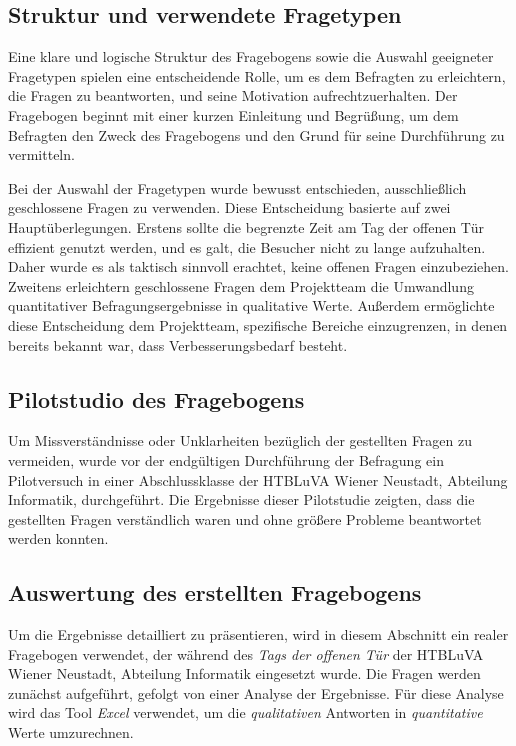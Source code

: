 \subsection{Struktur und verwendete Fragetypen}
Eine klare und logische Struktur des Fragebogens sowie die Auswahl geeigneter Fragetypen spielen eine entscheidende Rolle,
um es dem Befragten zu erleichtern, die Fragen zu beantworten, und seine Motivation aufrechtzuerhalten. Der Fragebogen
beginnt mit einer kurzen Einleitung und Begrüßung, um dem Befragten den Zweck des Fragebogens und den Grund für seine
Durchführung zu vermitteln.

Bei der Auswahl der Fragetypen wurde bewusst entschieden, ausschließlich geschlossene Fragen zu verwenden. Diese Entscheidung
basierte auf zwei Hauptüberlegungen. Erstens sollte die begrenzte Zeit am Tag der offenen Tür effizient genutzt werden,
und es galt, die Besucher nicht zu lange aufzuhalten. Daher wurde es als taktisch sinnvoll erachtet, keine offenen Fragen
einzubeziehen. Zweitens erleichtern geschlossene Fragen dem Projektteam die Umwandlung quantitativer Befragungsergebnisse
in qualitative Werte. Außerdem ermöglichte diese Entscheidung dem Projektteam, spezifische Bereiche einzugrenzen, in denen
bereits bekannt war, dass Verbesserungsbedarf besteht.

\subsection{Pilotstudio des Fragebogens}
Um Missverständnisse oder Unklarheiten bezüglich der gestellten Fragen zu vermeiden, wurde vor der endgültigen Durchführung
der Befragung ein Pilotversuch in einer Abschlussklasse der HTBLuVA Wiener Neustadt, Abteilung Informatik, durchgeführt.
Die Ergebnisse dieser Pilotstudie zeigten, dass die gestellten Fragen verständlich waren und ohne größere Probleme beantwortet
werden konnten.

\subsection{Auswertung des erstellten Fragebogens}
Um die Ergebnisse detailliert zu präsentieren, wird in diesem Abschnitt ein realer Fragebogen verwendet, der während des
\textit{Tags der offenen Tür} der HTBLuVA Wiener Neustadt, Abteilung Informatik eingesetzt wurde. Die Fragen werden zunächst
aufgeführt, gefolgt von einer Analyse der Ergebnisse. Für diese Analyse wird das Tool \textit{Excel} verwendet, um die
\textit{qualitativen} Antworten in \textit{quantitative} Werte umzurechnen.

